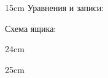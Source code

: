 
\answersheetwritenumbers

\begin{blankbox}{15cm}
    Уравнения и записи:

    \vspace{7cm}

    Схема ящика:
\end{blankbox}

\newpage

\begin{blankbox}{24cm}
\begin{center}
\end{center}
\end{blankbox}

\newpage

\begin{blankbox}{25cm}
\begin{center}
\end{center}
\end{blankbox}
